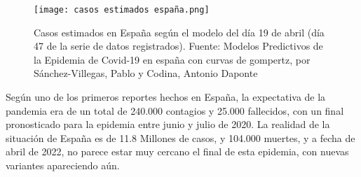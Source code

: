 \begin{figure}
    \texttt{[image: casos estimados españa.png]}
    \caption{Casos estimados en España según el modelo del día 19 de abril (día 47 de la serie de datos registrados). Fuente: Modelos Predictivos de la Epidemia de Covid-19 en españa con curvas de gompertz, por Sánchez-Villegas, Pablo y Codina, Antonio Daponte}
\end{figure}

Según uno de los primeros reportes hechos en España, la expectativa de la pandemia era de un total de 240.000 contagios y 25.000 fallecidos, con un final pronosticado para la epidemia entre junio y julio de 2020\cite{sanchez-villegas_codina_2020}. La realidad de la situación de España es de 11.8 Millones de casos, y 104.000 muertes, y a fecha de abril de 2022, no parece estar muy cercano el final de esta epidemia, con nuevas variantes apareciendo aún.


